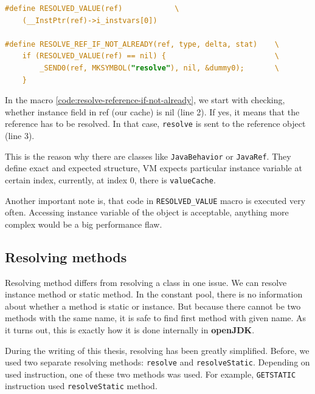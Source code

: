 \documentclass[11pt,twoside,a4paper]{book}
\begin{document}
\begin{lstlisting}[language=C, caption=RESOLVE\_REF\_IF\_NOT\_ALREADY macro, label=code:resolve-reference-if-not-already]
#define RESOLVED_VALUE(ref)            \
    (__InstPtr(ref)->i_instvars[0])

#define RESOLVE_REF_IF_NOT_ALREADY(ref, type, delta, stat)    \
    if (RESOLVED_VALUE(ref) == nil) {                         \
        _SEND0(ref, MKSYMBOL("resolve"), nil, &dummy0);       \
    }                                                         
\end{lstlisting}

In the macro \ref{code:resolve-reference-if-not-already}, we start with checking, whether instance field in ref (our cache) is nil (line 2). 
If yes, it means that the reference has to be resolved.
In that case, \texttt{resolve} is sent to the reference object (line 3).

This is the reason why there are classes like \texttt{JavaBehavior} or \texttt{JavaRef}. 
They define exact and expected structure, VM expects particular instance variable at certain index, currently, at index 0, there is \texttt{valueCache}.

Another important note is, that code in \texttt{RESOLVED\_VALUE} macro is executed very often.
Accessing instance variable of the object is acceptable, anything more complex would be a big performance flaw.

\subsection{Resolving methods}
\label{sec:resolving_methods}

Resolving method differs from resolving a class in one issue. 
We can resolve instance method or static method. 
In the constant pool, there is no information about whether a method is static or instance. 
But because there cannot be two methods with the same name, it is safe to find first method with given name.
As it turns out, this is exactly how it is done internally in \textbf{openJDK}.

During the writing of this thesis, resolving has been greatly simplified.
Before, we used two separate resolving methods: \texttt{resolve} and \texttt{resolveStatic}.
Depending on used instruction, one of these two methods was used.
For example, \texttt{GETSTATIC} instruction used \texttt{resolveStatic} method.
\end{document}
